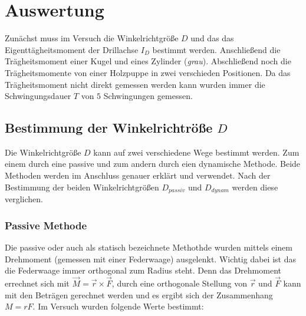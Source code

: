 \section{Auswertung}

Zunächst muss im Versuch die Winkelrichtgröße $D$ und das
das Eigenttägheitsmoment der Drillachse $I_D$ bestimmt werden.
Anschließend die Trägheitsmoment einer Kugel und eines Zylinder (\emph{grau}).
Abschließend noch die Trägheitsmomente von einer Holzpuppe in zwei verschieden Positionen.
Da das Trägheitsmoment nicht direkt gemessen werden kann wurden immer 
die Schwingungsdauer $T$ von $5$ Schwingungen gemessen.

\subsection{Bestimmung der Winkelrichtröße $D$}

Die Winkelrichtgröße $D$ kann auf zwei verschiedene Wege bestimmt werden.
Zum einem durch eine passive und zum andern durch eien  dynamische Methode.
Beide Methoden werden im Anschluss genauer erklärt und verwendet.
Nach der Bestimmung der beiden Winkelrichtgrößen $D_{passiv}$ und $D_{dynam}$
werden diese verglichen.


\subsubsection{Passive Methode}

Die passive oder auch als statisch bezeichnete Methothde wurden mittels einem Drehmoment (gemessen mit einer Federwaage) ausgelenkt.
Wichtig dabei ist das die Federwaage immer orthogonal zum Radius steht.
Denn das Drehmoment errechnet sich mit $\vec{M}=\vec{r}\times\vec{F}$, durch 
eine orthogonale Stellung von $\vec{r}$ und $\vec{F}$ kann mit den Beträgen 
gerechnet werden und es ergibt sich der Zusammenhang $M=rF$. 
Im Versuch wurden folgende Werte bestimmt:


